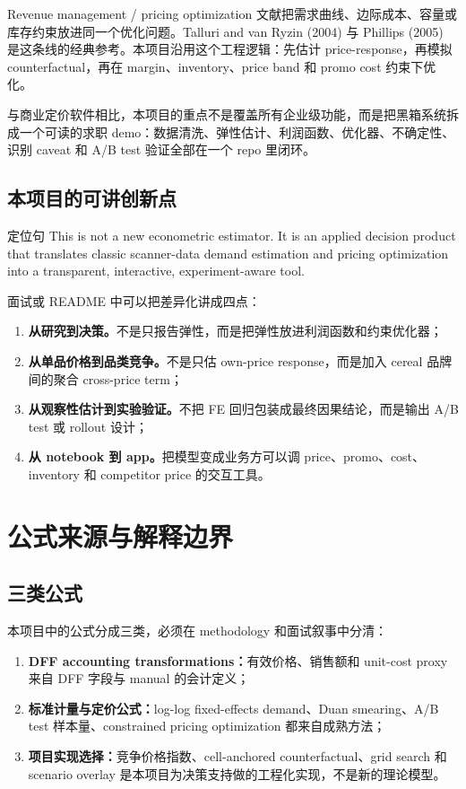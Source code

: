 \documentclass[UTF8,11pt,a4paper,fontset=none]{ctexart}
\begin{document}
Revenue management / pricing optimization 文献把需求曲线、边际成本、容量或库存约束放进同一个优化问题。Talluri and van Ryzin (2004) 与 Phillips (2005) 是这条线的经典参考。本项目沿用这个工程逻辑：先估计 price-response，再模拟 counterfactual，再在 margin、inventory、price band 和 promo cost 约束下优化。

与商业定价软件相比，本项目的重点不是覆盖所有企业级功能，而是把黑箱系统拆成一个可读的求职 demo：数据清洗、弹性估计、利润函数、优化器、不确定性、识别 caveat 和 A/B test 验证全部在一个 repo 里闭环。

\subsection{本项目的可讲创新点}

\begin{decisionbox}{定位句}
This is not a new econometric estimator. It is an applied decision product that translates classic scanner-data demand estimation and pricing optimization into a transparent, interactive, experiment-aware tool.
\end{decisionbox}

面试或 README 中可以把差异化讲成四点：

\begin{enumerate}
  \item \textbf{从研究到决策。}不是只报告弹性，而是把弹性放进利润函数和约束优化器；
  \item \textbf{从单品价格到品类竞争。}不是只估 own-price response，而是加入 cereal 品牌间的聚合 cross-price term；
  \item \textbf{从观察性估计到实验验证。}不把 FE 回归包装成最终因果结论，而是输出 A/B test 或 rollout 设计；
  \item \textbf{从 notebook 到 app。}把模型变成业务方可以调 price、promo、cost、inventory 和 competitor price 的交互工具。
\end{enumerate}

\section{公式来源与解释边界}

\subsection{三类公式}

本项目中的公式分成三类，必须在 methodology 和面试叙事中分清：

\begin{enumerate}
  \item \textbf{DFF accounting transformations：}有效价格、销售额和 unit-cost proxy 来自 DFF 字段与 manual 的会计定义；
  \item \textbf{标准计量与定价公式：}log-log fixed-effects demand、Duan smearing、A/B test 样本量、constrained pricing optimization 都来自成熟方法；
  \item \textbf{项目实现选择：}竞争价格指数、cell-anchored counterfactual、grid search 和 scenario overlay 是本项目为决策支持做的工程化实现，不是新的理论模型。
\end{enumerate}
\end{document}
